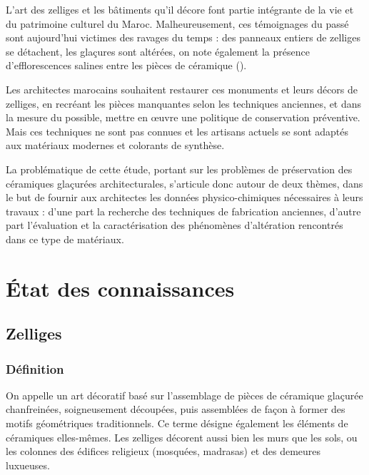 L'art des zelliges et les bâtiments qu'il décore font partie 
intégrante de la vie et du patrimoine culturel du Maroc. 
Malheureusement, ces témoignages du passé sont aujourd'hui 
victimes des ravages du temps : des panneaux entiers de zelliges 
se détachent, les glaçures sont altérées, on note également la 
présence d'efflorescences salines entre les pièces de céramique
().

Les architectes marocains souhaitent restaurer ces monuments et 
leurs décors de zelliges, en recréant les pièces manquantes selon 
les techniques anciennes, et dans la mesure du possible, mettre en 
{\oe}uvre une politique de conservation préventive. Mais ces 
techniques ne sont pas connues et les artisans actuels se sont 
adaptés aux matériaux modernes et colorants de synthèse.

La problématique de cette étude, portant sur les problèmes de 
préservation des céramiques glaçurées architecturales, s'articule 
donc autour de deux thèmes, dans le but de fournir aux architectes 
les données physico-chimiques nécessaires à leurs travaux : d'une 
part la recherche des techniques de fabrication anciennes, d'autre 
part l'évaluation et la caractérisation des phénomènes d'altération 
rencontrés dans ce type de matériaux.

\chapter{État des connaissances}

\section{Zelliges \quad\arabzell}

\subsection{Définition}
On appelle  un art décoratif basé sur l'assemblage 
de pièces de céramique glaçurée chanfreinées, soigneusement 
découpées, puis assemblées de façon à former des motifs géométriques 
traditionnels. Ce terme désigne également les éléments de céramiques 
elles-mêmes. Les zelliges décorent aussi bien les murs que les sols, 
ou les colonnes des édifices religieux (mosquées, madrasas) et des 
demeures luxueuses.

